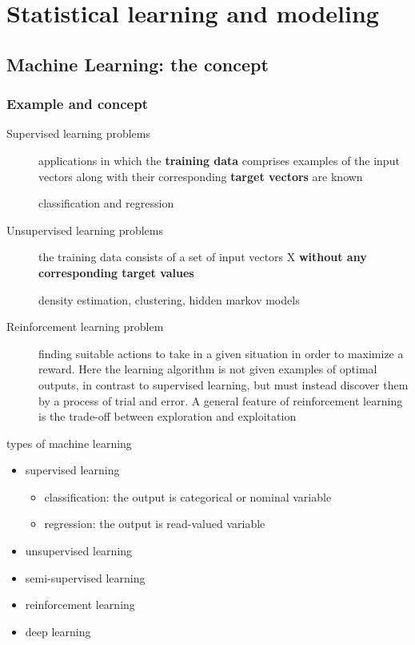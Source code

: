 \documentclass[11pt]{article}
\begin{document}
\section{Statistical learning and modeling}
\label{sec:org9a7291c}
\subsection{Machine Learning: the concept}
\label{sec:org12226bf}
\subsubsection{Example and concept}
\label{sec:org08f7868}
\begin{description}
\item[{Supervised learning problems}] applications in which the \textbf{training data} comprises examples of the input
vectors along with their corresponding \textbf{target vectors} are known

classification and regression
\item[{Unsupervised learning problems}] the training data consists of a set of input vectors X \textbf{without any
corresponding target values}

density estimation, clustering, hidden markov models
\item[{Reinforcement learning problem}] finding suitable actions to take in a given situation in order to
maximize a reward. Here the learning algorithm is not given examples of
optimal outputs, in contrast to supervised learning, but must instead
discover them by a process of trial and error. A general feature of
reinforcement learning is the trade-off between exploration and exploitation
\end{description}

types of machine learning
\begin{itemize}
\item supervised learning
\begin{itemize}
\item classification: the output is categorical or nominal variable
\item regression: the output is read-valued variable
\end{itemize}
\item unsupervised learning
\item semi-supervised learning
\item reinforcement learning
\item deep learning
\end{itemize}
\end{document}
